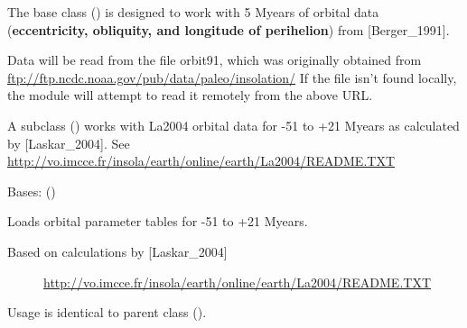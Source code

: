 \documentclass[a4paper,10pt,english]{sphinxmanual}
\begin{document}
The base class {\hyperref[api/climlab.solar:climlab.solar.orbital.OrbitalTable]{\emph{}}} () is designed to work with 5 Myears of orbital data
(\textbf{eccentricity, obliquity, and longitude of perihelion}) from {[}Berger\_1991{]}.

Data will be read from the file orbit91, which was originally obtained from
\href{ftp://ftp.ncdc.noaa.gov/pub/data/paleo/insolation/}{ftp://ftp.ncdc.noaa.gov/pub/data/paleo/insolation/}
If the file isn't found locally, the module will attempt to read it remotely
from the above URL.

A subclass {\hyperref[api/climlab.solar:climlab.solar.orbital.LongOrbitalTable]{\emph{}}} () works with La2004 orbital data for 
-51 to +21 Myears as calculated by {[}Laskar\_2004{]}.
See \href{http://vo.imcce.fr/insola/earth/online/earth/La2004/README.TXT}{http://vo.imcce.fr/insola/earth/online/earth/La2004/README.TXT}

\begin{fulllineitems}
\label{api/climlab.solar:climlab.solar.orbital.LongOrbitalTable}
Bases: {\hyperref[api/climlab.solar:climlab.solar.orbital.OrbitalTable]{\emph{}}} ()

Loads orbital parameter tables for -51 to +21 Myears.
\begin{description}
\item[{Based on calculations by {[}Laskar\_2004{]}}] \leavevmode
\href{http://vo.imcce.fr/insola/earth/online/earth/La2004/README.TXT}{http://vo.imcce.fr/insola/earth/online/earth/La2004/README.TXT}

\end{description}

Usage is identical to parent class {\hyperref[api/climlab.solar:climlab.solar.orbital.OrbitalTable]{\emph{}}} ().

\end{fulllineitems}

\end{document}
